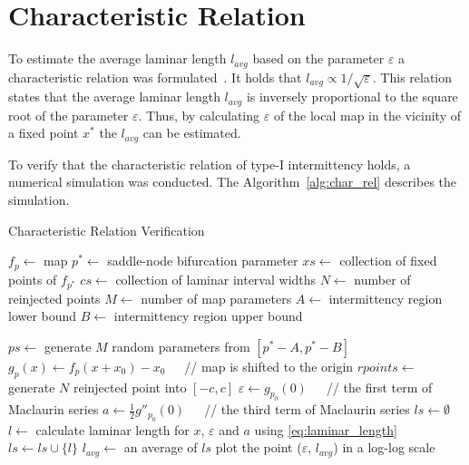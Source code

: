 \section{Characteristic Relation}

To estimate the average laminar length $l_{avg}$ based on the parameter $\varepsilon$ a characteristic relation was formulated~\cite{Elaskar2017}.
It holds that $l_{avg} \propto 1/\sqrt{\varepsilon}$.
This relation states that the average laminar length $l_{avg}$ is inversely proportional to the square root of the parameter $\varepsilon$.
Thus, by calculating $\varepsilon$ of the local map in the vicinity of a fixed point $x^{*}$ the $l_{avg}$ can be estimated.
\par
To verify that the characteristic relation of type-I intermittency holds, a numerical simulation was conducted.
The Algorithm~\ref{alg:char_rel} describes the simulation.

\begin{algorithm}[!h]
    \caption{Characteristic Relation Verification}
    \label{alg:char_rel}
    \begin{algorithmic}[1]
        \Statex $f_{p} \gets$ map
        \Statex $p^{*} \gets$ saddle-node bifurcation parameter
        \Statex $xs \gets$ collection of fixed points of $f_{p^{*}}$
        \Statex $cs \gets$ collection of laminar interval widths
        \Statex $N \gets$ number of reinjected points
        \Statex $M \gets$ number of map parameters
        \Statex $A \gets$ intermittency region lower bound
        \Statex $B \gets$ intermittency region upper bound

        \State $ps \gets$ generate $M$ random parameters from $[p^{*}-A, p^{*}-B]$
            \State $g_{p}(x) \gets f_{p}(x + x_0) - x_0$   $\;\;\;$ // map is shifted to the origin
                    \State $rpoints \gets$ generate $N$ reinjected point into $[-c, c]$
                    \State $\varepsilon \gets g_{p_{0}}(0)$  $\;\;\;$   // the first term of Maclaurin series
                    \State $a \gets \frac{1}{2}g''_{p_{0}}(0)$  $\;\;\;$  // the third term of Maclaurin series
                    \State $ls \gets \emptyset$
                        \State $l \gets$ calculate laminar length for $x$, $\varepsilon$ and $a$ using \eqref{eq:laminar_length}
                        \State $ls \gets ls \cup \{l\}$
                    \EndFor
                    \State $l_{avg} \gets$ an average of $ls$
                    \State plot the point ($\varepsilon$, $l_{avg}$) in a log-log scale
                \EndFor
            \EndFor
        \EndFor
    \end{algorithmic}
\end{algorithm}

